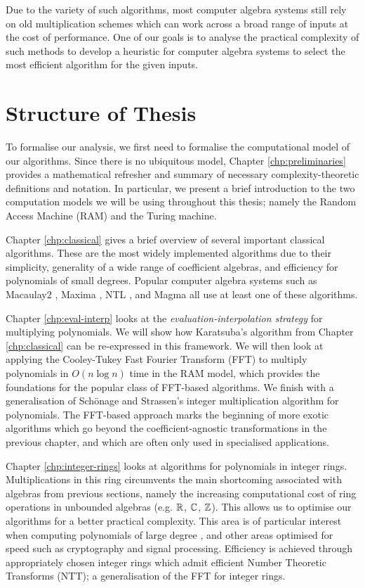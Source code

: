 Due to the variety of such algorithms, most computer algebra systems still rely on old multiplication schemes which can work across a broad range of inputs at the cost of performance. One of our goals is to analyse the practical complexity of such methods to develop a heuristic for computer algebra systems to select the most efficient algorithm for the given inputs.

\section{Structure of Thesis}
\label{sec:Structure-of-Thesis}

To formalise our analysis, we first need to formalise the computational model of our algorithms. Since there is no ubiquitous model, Chapter \ref{chp:preliminaries} provides a mathematical refresher and summary of necessary complexity-theoretic definitions and notation. In particular, we present a brief introduction to the two computation models we will be using throughout this thesis; namely the Random Access Machine (RAM) and the Turing machine.

Chapter \ref{chp:classical} gives a brief overview of several important classical algorithms. These are the most widely implemented algorithms due to their simplicity, generality of a wide range of coefficient algebras, and efficiency for polynomials of small degrees. Popular computer algebra systems such as Macaulay2 \cite{macaulay2-polynomial}, Maxima \cite{maxima-karatsuba}, NTL \cite{ntl}, and Magma \cite{magma} all use at least one of these algorithms.

Chapter \ref{chp:eval-interp} looks at the \emph{evaluation-interpolation strategy} for multiplying polynomials. We will show how Karatsuba's algorithm from Chapter \ref{chp:classical} can be re-expressed in this framework. We will then look at applying the Cooley-Tukey Fast Fourier Transform (FFT) to multiply polynomials in $O(n \log n)$ time in the RAM model, which provides the foundations for the popular class of FFT-based algorithms. We finish with a generalisation of Sch\"{o}nage and Strassen's integer multiplication algorithm for polynomials. The FFT-based approach marks the beginning of more exotic algorithms which go beyond the coefficient-agnostic transformations in the previous chapter, and which are often only used in specialised applications.

Chapter \ref{chp:integer-rings} looks at algorithms for polynomials in integer rings. Multiplications in this ring circumvents the main shortcoming associated with algebras from previous sections, namely the increasing computational cost of ring operations in unbounded algebras (e.g. ${\mathbb R}$, ${\mathbb C}$, ${\mathbb Z}$). This allows us to optimise our algorithms for a better practical complexity. This area is of particular interest when computing polynomials of large degree \cite{crt-parallel-mul}\cite{crt-mul-gpu}, and other areas optimised for speed such as cryptography and signal processing. Efficiency is achieved through appropriately chosen integer rings which admit efficient Number Theoretic Transforms (NTT); a generalisation of the FFT for integer rings.

